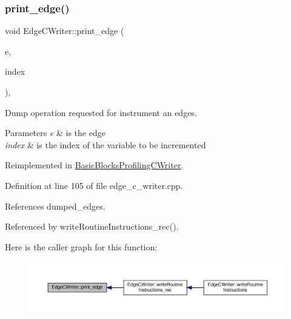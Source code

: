 \subsubsection{\texorpdfstring{print\+\_\+edge()}{print\_edge()}}
{\footnotesize\ttfamily void Edge\+C\+Writer\+::print\+\_\+edge (\begin{DoxyParamCaption}\item[{\hyperlink{graph_8hpp_a9eb9afea34e09f484b21f2efd263dd48}{Edge\+Descriptor}}]{e,  }\item[{unsigned int}]{index }\end{DoxyParamCaption})\hspace{0.3cm}{\ttfamily [protected]}, {\ttfamily [virtual]}}



Dump operation requested for instrument an edges. 


\begin{DoxyParams}{Parameters}
{\em e} & is the edge \\
\hline
{\em index} & is the index of the variable to be incremented \\
\hline
\end{DoxyParams}


Reimplemented in \hyperlink{classBasicBlocksProfilingCWriter_a2efe4603c6a9adb508091feb50cabf5f}{Basic\+Blocks\+Profiling\+C\+Writer}.



Definition at line 105 of file edge\+\_\+c\+\_\+writer.\+cpp.



References dumped\+\_\+edges.



Referenced by write\+Routine\+Instructions\+\_\+rec().

Here is the caller graph for this function\+:
\nopagebreak
\begin{figure}[H]
\begin{center}
\leavevmode
\includegraphics[width=350pt]{d7/dee/classEdgeCWriter_afafb806eb259b1e582c4b4cd9abe201a_icgraph}
\end{center}
\end{figure}
\mbox{\label{classEdgeCWriter_afb0e9ae8b8f6b8d697f555dbda6c90ab}} 

